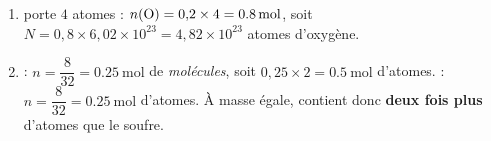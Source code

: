 \documentclass[11pt,a4paper]{article}
\begin{document}
\begin{corrige}
\begin{enumerate}[label=\alph*)]
  \item {} porte $4$ atomes  : $n(\ce{O}) = 0{,}2\times 4 = \SI{0.8}{\mole}$, soit
        $N = 0{,}8\times 6{,}02\times10^{23} = 4{,}82\times10^{23}$ atomes d'oxygène.
  \item {} : $n = \dfrac{8}{32} = \SI{0.25}{\mole}$ de \emph{molécules}, soit
        $0{,}25\times 2 = \SI{0.5}{\mole}$ d'atomes.  : $n = \dfrac{8}{32} = \SI{0.25}{\mole}$ d'atomes.
        À masse égale,  contient donc \textbf{deux fois plus} d'atomes que le soufre.
\end{enumerate}
\end{corrige}
\end{document}
